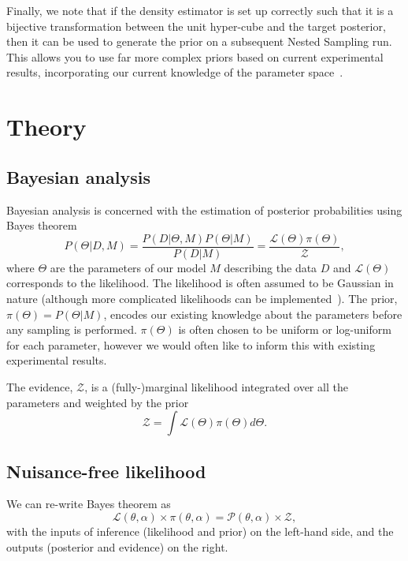 Finally, we note that if the density estimator is set up correctly such that it is a bijective transformation between the unit hyper-cube and the target posterior, then it can be used to generate the prior on a subsequent Nested Sampling run. This allows you to use far more complex priors based on current experimental results, incorporating our current knowledge of the parameter space~\citep{Alsing_bijectors_2021}.

\section{Theory}
\label{sec:theory}

\subsection{Bayesian analysis}
\label{sec:bayesian_inference}

Bayesian analysis is concerned with the estimation of posterior probabilities using Bayes theorem
\begin{equation}
    P(\Theta | D, M) = \frac{P(D| \Theta, M) P(\Theta|M)}{P(D|M)} = \frac{\mathcal{L}(\Theta)\pi(\Theta)}{\mathcal{Z}},
    \label{eq:bayes_theorem}
\end{equation}
where $\Theta$ are the parameters of our model $M$ describing the data $D$ and $\mathcal{L}(\Theta)$ corresponds to the likelihood. The likelihood is often assumed to be Gaussian in nature (although more complicated likelihoods can be implemented~\cite{Scheutwinkel2022a}). The prior, $\pi(\Theta) = P(\Theta|M)$, encodes our existing knowledge about the parameters before any sampling is performed. $\pi(\Theta)$ is often chosen to be uniform or log-uniform for each parameter, however we would often like to inform this with existing experimental results.

The evidence, $\mathcal{Z}$, is a (fully-)marginal likelihood integrated over all the parameters and weighted by the prior
\begin{equation}
    \mathcal{Z} = \int \mathcal{L}(\Theta)\pi(\Theta)d\Theta.
    \label{eq:evidence}
\end{equation}

\subsection{Nuisance-free likelihood}
\label{sec:marginal_likelihood}

We can re-write Bayes theorem as
\begin{equation}
     \mathcal{L}(\theta,\alpha)\times \pi(\theta,\alpha) =\mathcal{P}(\theta,\alpha)\times \mathcal{Z},
    \label{eqn:bayes}
\end{equation}
with the inputs of inference (likelihood and prior) on the left-hand side, and the outputs (posterior and evidence) on the right.


